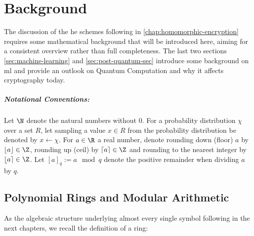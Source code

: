 \chapter{Background}
\label{chap:background}
\vspace{-1cm}

The discussion of the \gls{he} schemes following in \cref{chap:homomorphic-encryption} requires some mathematical background that will be introduced here, aiming for a consistent overview rather than full completeness.
The last two sections \ref{sec:machine-learning} and \ref{sec:post-quantum-sec} introduce some background on \glsdesc{ml} and provide an outlook on Quantum Computation and why it affects cryptography today.

\paragraph{Notational Conventions:}
Let $\N$ denote the natural numbers without $0$.
For a probability distribution $\chi$ over a set $R$, let sampling a value $x \in R$ from the probability distribution be denoted by $x \leftarrow \chi$.
For $a \in \R$ a real number, denote rounding down (floor) $a$ by $\lfloor a \rfloor \in \Z$, rounding up (ceil) by $\lceil a \rceil \in \Z$ and rounding to the nearest integer by $\lfloor a \rceil \in \Z$.
Let $[a]_q := a \mod q$ denote the positive remainder when dividing $a$ by $q$.

\section{Polynomial Rings and Modular Arithmetic}
As the algebraic structure underlying almost every single symbol following in the next chapters, we recall the definition of a ring:

